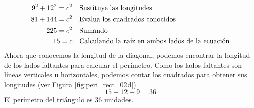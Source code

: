 \begin{solutionbox}{16cm}
\begin{minipage}{0.65\textwidth}
\begin{align*}
            9^2+12^2  =c^2 & \text{\quad Sustituye las longitudes}                         \\
            81 +144 =c^2   & \text{\quad Evalua los cuadrados conocidos}                   \\
            225=c^2        & \text{\quad Sumando }                                         \\
            15=c           & \text{\quad Calculando la raíz en ambos lados de la ecuación} \\
        \end{align*}
        Ahora que conocemos la longitud de la diagonal, podemos encontrar la longitud de los lados faltantes para calcular el perímetro.
        Como los lados faltantes son líneas verticales u horizontales, podemos contar los cuadrados para obtener sus longitudes (ver Figura \ref{fig:peri_rect_02d}).
        \[15+12+9=36\]
        El perímetro del triángulo es 36 unidades.
    \end{minipage}
\end{solutionbox}
